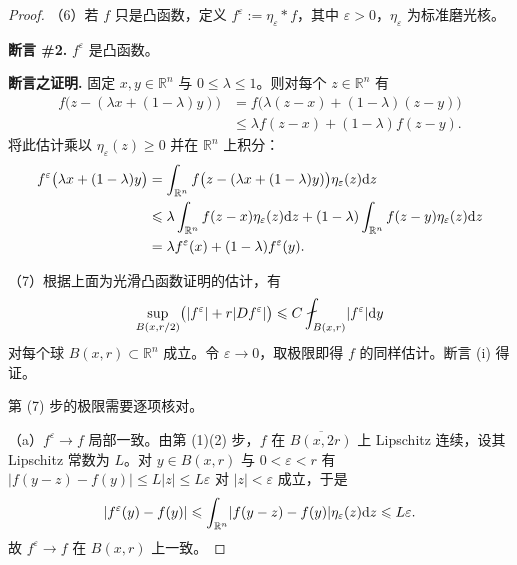 \documentclass[../../main.tex]{subfiles}%
\begin{document}
\begin{proof}
（6）若 $f$ 只是凸函数，定义 $f^{\varepsilon}:=\eta_{\varepsilon}*f$，其中 $\varepsilon>0$，$\eta_{\varepsilon}$ 为标准磨光核。

\textbf{断言 \#2.} $f^{\varepsilon}$ 是凸函数。

\textbf{断言之证明.} 固定 $x,y\in\mathbb{R}^n$ 与 $0\leqslant\lambda\leqslant1$。则对每个 $z\in\mathbb{R}^n$ 有
\begin{align*}
f\bigl(z-(\lambda x+(1-\lambda)y)\bigr)&=f\bigl(\lambda(z-x)+(1-\lambda)(z-y)\bigr)\\
&\leqslant\lambda f(z-x)+(1-\lambda)f(z-y).
\end{align*}
将此估计乘以 $\eta_{\varepsilon}(z)\geqslant0$ 并在 $\mathbb{R}^n$ 上积分：
\begin{align*}
f^{\varepsilon}\bigl(\lambda x+(1-\lambda)y\bigr)
&=\int_{\mathbb{R}^n}f\bigl(z-(\lambda x+(1-\lambda)y)\bigr)\eta_{\varepsilon}(z)\mathrm{d} z\\
&\leqslant\lambda\int_{\mathbb{R}^n}f(z-x)\eta_{\varepsilon}(z)\mathrm{d} z+(1-\lambda)\int_{\mathbb{R}^n}f(z-y)\eta_{\varepsilon}(z)\mathrm{d} z\\
&=\lambda f^{\varepsilon}(x)+(1-\lambda)f^{\varepsilon}(y).
\end{align*}

（7）根据上面为光滑凸函数证明的估计，有
\begin{align*}
\sup_{B(x,r/2)}\bigl(\lvert f^{\varepsilon}\rvert+r\lvert Df^{\varepsilon}\rvert\bigr)\leqslant C\fint_{B(x,r)}\lvert f^{\varepsilon}\rvert\diff y
\end{align*}
对每个球 $B(x,r)\subset\mathbb{R}^n$ 成立。令 $\varepsilon\to0$，取极限即得 $f$ 的同样估计。断言 (i) 得证。

第 (7) 步的极限需要逐项核对。

（a）$f^{\varepsilon}\to f$ 局部一致。由第 (1)(2) 步，$f$ 在 $\overline{B(x,2r)}$ 上 Lipschitz 连续，设其 Lipschitz 常数为 $L$。对 $y\in B(x,r)$ 与 $0<\varepsilon<r$ 有 $\lvert f(y-z)-f(y)\rvert\leqslant L\lvert z\rvert\leqslant L\varepsilon$ 对 $\lvert z\rvert<\varepsilon$ 成立，于是
\begin{align*}
\lvert f^{\varepsilon}(y)-f(y)\rvert\leqslant\int_{\mathbb{R}^n}\lvert f(y-z)-f(y)\rvert\eta_{\varepsilon}(z)\mathrm{d} z\leqslant L\varepsilon .
\end{align*}
故 $f^{\varepsilon}\to f$ 在 $B(x,r)$ 上一致。


\end{proof}
\end{document}
